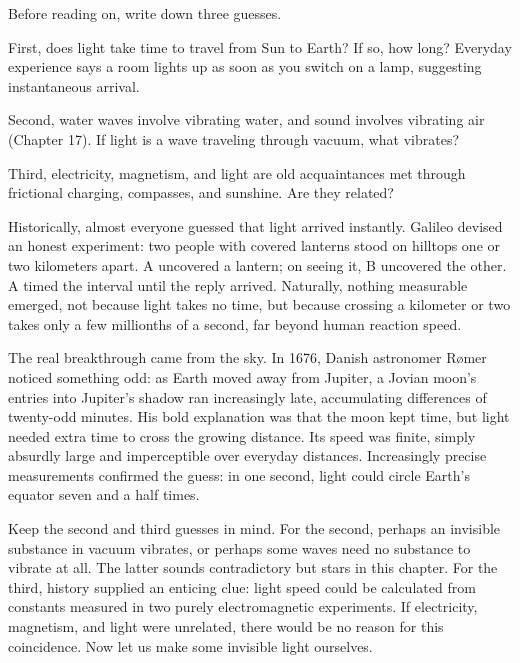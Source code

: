 \begin{mainline}
Before reading on, write down three guesses.

First, does light take time to travel from Sun to Earth? If so, how long? Everyday experience says a room lights up as soon as you switch on a lamp, suggesting instantaneous arrival.

Second, water waves involve vibrating water, and sound involves vibrating air (Chapter 17). If light is a wave traveling through vacuum, what vibrates?

Third, electricity, magnetism, and light are old acquaintances met through frictional charging, compasses, and sunshine. Are they related?

Historically, almost everyone guessed that light arrived instantly. Galileo devised an honest experiment: two people with covered lanterns stood on hilltops one or two kilometers apart. A uncovered a lantern; on seeing it, B uncovered the other. A timed the interval until the reply arrived. Naturally, nothing measurable emerged, not because light takes no time, but because crossing a kilometer or two takes only a few millionths of a second, far beyond human reaction speed.

The real breakthrough came from the sky. In 1676, Danish astronomer Rømer noticed something odd: as Earth moved away from Jupiter, a Jovian moon's entries into Jupiter's shadow ran increasingly late, accumulating differences of twenty-odd minutes. His bold explanation was that the moon kept time, but light needed extra time to cross the growing distance. Its speed was finite, simply absurdly large and imperceptible over everyday distances. Increasingly precise measurements confirmed the guess: in one second, light could circle Earth's equator seven and a half times.

Keep the second and third guesses in mind. For the second, perhaps an invisible substance in vacuum vibrates, or perhaps some waves need no substance to vibrate at all. The latter sounds contradictory but stars in this chapter. For the third, history supplied an enticing clue: light speed could be calculated from constants measured in two purely electromagnetic experiments. If electricity, magnetism, and light were unrelated, there would be no reason for this coincidence. Now let us make some invisible light ourselves.
\end{mainline}


